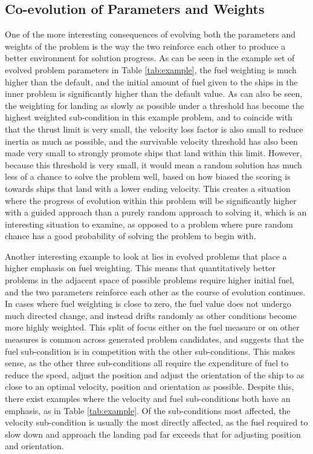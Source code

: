 \documentclass[conference]{IEEEtran}
\begin{document}
\subsection{Co-evolution of Parameters and Weights}

One of the more interesting consequences of evolving both the parameters and weights of the problem is the way the two reinforce each other to produce a better environment for solution progress. As can be seen in the example set of evolved problem parameters in Table \ref{tab:example}, the fuel weighting is much higher than the default, and the initial amount of fuel given to the ships in the inner problem is significantly higher than the default value. As can also be seen, the weighting for landing as slowly as possible under a threshold has become the highest weighted sub-condition in this example problem, and to coincide with that the thrust limit is very small, the velocity loss factor is also small to reduce inertia as much as possible, and the survivable velocity threshold has also been made very small to strongly promote ships that land within this limit. However, because this threshold is very small, it would mean a random solution has much less of a chance to solve the problem well, based on how biased the scoring is towards ships that land with a lower ending velocity. This creates a situation where the progress of evolution within this problem will be significantly higher with a guided approach than a purely random approach to solving it, which is an interesting situation to examine, as opposed to a problem where pure random chance has a good probability of solving the problem to begin with.

Another interesting example to look at lies in evolved problems that place a higher emphasis on fuel weighting. This means that quantitatively better problems in the adjacent space of possible problems require higher initial fuel, and the two parameters reinforce each other as the course of evolution continues. In cases where fuel weighting is close to zero, the fuel value does not undergo much directed change, and instead drifts randomly as other conditions become more highly weighted. This split of focus either on the fuel measure or on other measures is common across generated problem candidates, and suggests that the fuel sub-condition is in competition with the other sub-conditions. This makes sense, as the other three sub-conditions all require the expenditure of fuel to reduce the speed, adjust the position and adjust the orientation of the ship to as close to an optimal velocity, position and orientation as possible. Despite this, there exist examples where the velocity and fuel sub-conditions both have an emphasis, as in Table \ref{tab:example}. Of the sub-conditions most affected, the velocity sub-condition is usually the most directly affected, as the fuel required to slow down and approach the landing pad far exceeds that for adjusting position and orientation.
\end{document}
